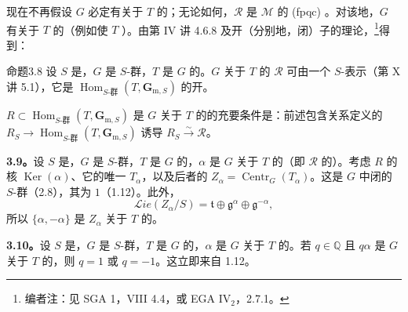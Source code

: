 现在不再假设 $G$ 必定有关于 $T$ 的；无论如何，$\mathscr R$ 是 $\mathscr M$ 的 (fpqc) 。对该地，$G$ 有关于 $T$ 的（例如使 $T$ ）。由第 IV 讲 4.6.8 及开（分别地，闭）子的理论，\footnote[30]{编者注：见 SGA 1，VIII 4.4，或 EGA IV$_2$，2.7.1。}得到：
\begin{SGAresult}{命题}{3.8}
设 $S$ 是，$G$ 是 $S$-群，$T$ 是 $G$ 的。$G$ 关于 $T$ 的 $\mathscr R$ 可由一个 $S$-表示（第 X 讲 5.1），它是 $\operatorname{Hom}_{S\text{-群}}(T,\mathbf G_{\mathrm m,S})$ 的开。

$R\subset\operatorname{Hom}_{S\text{-群}}(T,\mathbf G_{\mathrm m,S})$ 是 $G$ 关于 $T$ 的的充要条件是：前述包含关系定义的 $R_S\to\operatorname{Hom}_{S\text{-群}}(T,\mathbf G_{\mathrm m,S})$ 诱导 $R_S\xrightarrow{\sim}\mathscr R$。
\end{SGAresult}
\textbf{3.9。}设 $S$ 是，$G$ 是 $S$-群，$T$ 是 $G$ 的，$\alpha$ 是 $G$ 关于 $T$ 的（即 $\mathscr R$ 的）。考虑 $R$ 的核 $\operatorname{Ker}(\alpha)$、它的唯一 $T_\alpha$，以及后者的 $Z_\alpha=\operatorname{Centr}_G(T_\alpha)$。这是 $G$ 中闭的 $S$-群（2.8），其为 $1$（1.12）。此外，
\[
\mathscr{L}\!ie(Z_\alpha/S)=\mathfrak t\oplus\mathfrak g^\alpha\oplus\mathfrak g^{-\alpha},
\]
所以 $\{\alpha,-\alpha\}$ 是 $Z_\alpha$ 关于 $T$ 的。

\textbf{3.10。}设 $S$ 是，$G$ 是 $S$-群，$T$ 是 $G$ 的，$\alpha$ 是 $G$ 关于 $T$ 的。若 $q\in\mathbb Q$ 且 $q\alpha$ 是 $G$ 关于 $T$ 的，则 $q=1$ 或 $q=-1$。这立即来自 1.12。

